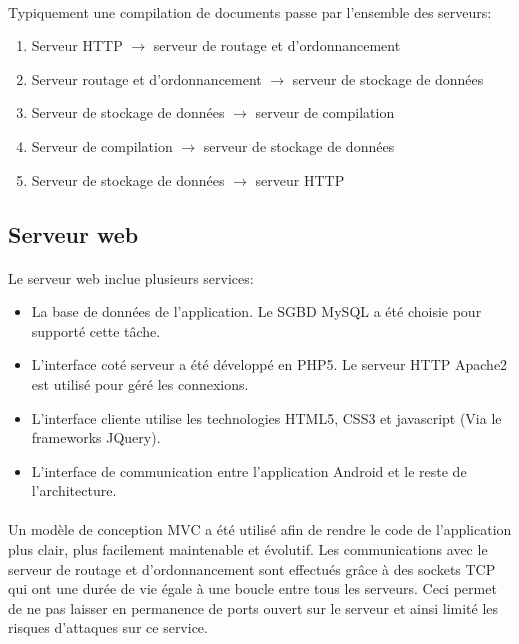 \documentclass[a4paper,12pt]{article}
\begin{document}
\paragraph*{}
Typiquement une compilation de documents passe par l'ensemble des serveurs:
\begin{enumerate}
 \item Serveur HTTP $\rightarrow$ serveur de routage et d'ordonnancement
 \item Serveur routage et d'ordonnancement $\rightarrow$ serveur de stockage de données
 \item Serveur de stockage de données $\rightarrow$ serveur de compilation
 \item Serveur de compilation $\rightarrow$ serveur de stockage de données
 \item Serveur de stockage de données $\rightarrow$ serveur HTTP
\end{enumerate}



\subsection{Serveur web}
\paragraph*{}
Le serveur web inclue plusieurs services:
\begin{itemize}
 \item La base de données de l'application. Le SGBD MySQL a été choisie pour supporté cette tâche.
 \item L'interface coté serveur a été développé en PHP5. Le serveur HTTP Apache2 est utilisé pour géré les connexions.
 \item L'interface cliente utilise les technologies HTML5, CSS3 et javascript (Via le frameworks JQuery).
 \item L'interface de communication entre l'application Android et le reste de l'architecture.
\end{itemize}

\paragraph*{}
Un modèle de conception MVC a été utilisé afin de rendre le code de l'application plus clair, plus facilement maintenable et évolutif. Les communications avec le serveur de routage et d'ordonnancement sont effectués grâce à des sockets TCP qui ont une durée de vie égale à une boucle entre tous les serveurs. Ceci permet de ne pas laisser en permanence de ports ouvert sur le serveur et ainsi limité les risques d'attaques sur ce service.
\end{document}
